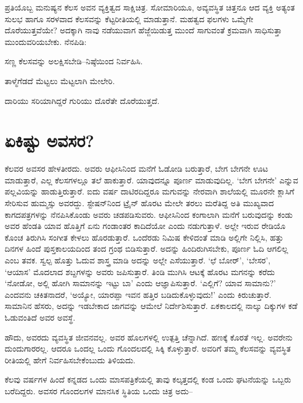 ಪ್ರತಿಯೊಬ್ಬ ಮನುಷ್ಯನ ಕೆಲಸ ಅವನ ವ್ಯಕ್ತಿತ್ವದ ಸಾಕ್ಷಿಚಿತ್ರ. ಸೋಮಾರಿಯೂ, ಅವ್ಯವಸ್ಥಿತ ಚಿತ್ತನೂ ಆದ ವ್ಯಕ್ತಿ ಅತ್ಯಂತ ಸುಲಭ ಹಾಗೂ ಸರಳವಾದ ಕೆಲಸವನ್ನು ಕೆಟ್ಟರೀತಿಯಲ್ಲಿ ಮಾಡುತ್ತಾನೆ. ಮಹತ್ವದ ಫಲಗಳು ಒಮ್ಮೆಗೇ ದೊರೆಯುತ್ತವೆಯೇ? ಅದಕ್ಕಾಗಿ ನಾವು ನಡೆಯುವಾಗ ಹೆಜ್ಜೆಯಿಡುತ್ತ ಮುಂದೆ ಸಾಗುವಂತೆ ಕ್ರಮವಾಗಿ ಸಾಧಿಸುತ್ತಾ ಮುಂದುವರಿಯಬೇಕು. ನೆನಪಿಡಿ:

ಸಣ್ಣ ಕೆಲಸವನ್ನು ಅಲಕ್ಷಿಸಬೇಡಿ–ನಿಷ್ಠೆಯಿಂದ ನಿರ್ವಹಿಸಿ.

ತಾಳ್ಮೆಗೆಡದೆ ಮೆಟ್ಟಲು ಮೆಟ್ಟಲಾಗಿ ಮೇಲೇರಿ.

ದಾರಿಯು ಸರಿಯಾಗಿದ್ದರೆ ಗುರಿಯು ದೊರೆತೇ ದೊರೆಯುತ್ತದೆ.


\section*{ಏಕಿಷ್ಟು ಅವಸರ?}


ಕೆಲವರ ಅವಸರ ಹೇಳತೀರದು. ಅವರು ಆಫೀಸಿನಿಂದ ಮನೆಗೆ ಓಡೋಡಿ ಬರುತ್ತಾರೆ, ಬೇಗ ಬೇಗನೇ ಊಟ ಮಾಡುತ್ತಾರೆ, ಎಲ್ಲ ಕೆಲಸಗಳಲ್ಲೂ ತಲೆ ಹಾಕುತ್ತಾರೆ. ಯಾವುದನ್ನೂ ಪೂರ್ಣ ಮಾಡುವುದಿಲ್ಲ. ‘ಬೇಗ ಬೇಗನೇ’ ಎನ್ನುವ ಪಲ್ಲವಿಯನ್ನು ಹಾಡುತ್ತಿರುತ್ತಾರೆ. ಐದು ವರ್ಷ ದಾಟಿರದಿದ್ದರೂ ಮಗುವನ್ನು ನೇರವಾಗಿ ಶಾಲೆಯಲ್ಲಿ ಮೂರನೇ ಕ್ಲಾಸಿಗೆ ಸೇರಿಸುವ ಹುಮ್ಮಸ್ಸು ಅವರದ್ದು. ಸ್ಟೇಷನ್​ನಿಂದ ಟ್ರೈನ್ ಹೊರಟ ಮೇಲೇ ತರಲು ಮರೆತಿದ್ದ ಅತಿ ಮುಖ್ಯವಾದ ಕಾಗದಪತ್ರಗಳನ್ನು ನೆನಪಿಸಿಕೊಂಡು ಅವರು ಚಡಪಡಿಸುವರು. ಆಫೀಸಿನಿಂದ ಕಂಗಾಲಾಗಿ ಮನೆಗೆ ಬರುವುದನ್ನು ಕಂಡು ಅವರ ಹೆಂಡತಿ ಯಾವ ಹೊತ್ತಿಗೆ ಏನು ಗಂಡಾಂತರ ಕಾದಿದೆಯೋ ಎಂದು ನಡುಗುತ್ತಾಳೆ. ಅಲ್ಲೇ ಇರುವ ರೇಡಿಯೊ ಕೊಂಚ ತಿರುಗಿಸಿ ಸಂಗೀತ ಕೇಳಲು ಹೊರಡುತ್ತಾರೆ. ಒಂದೆರಡು ನಿಮಿಷ ಕೇಳಿದಂತೆ ಮಾಡಿ ಅಲ್ಲಿಗೇ ನಿಲ್ಲಿಸಿ, ಹತ್ತು ದಿನಗಳ ಹಿಂದೆ ಪುಸ್ತಕಾಲಯದಿಂದ ತಂದ ಗ್ರಂಥ ಬಿಡಿಸುತ್ತಾರೆ. ಅದನ್ನು ಹಿಂದಿರುಗಿಸಬೇಕು, ಪೂರ್ಣ ಓದಿ ಆಗಲಿಲ್ಲ ಎಂಬ ತವಕ. ಸ್ವಲ್ಪ ಹೊತ್ತು ಓದುವ ಶಾಸ್ತ್ರ ಮಾಡಿ ಅದನ್ನು ಅಲ್ಲೇ ಎಸೆಯುತ್ತಾರೆ. ‘ಛೆ ಬೋರ್​’, ‘ಬೇಸರ’, ‘ಆಯಾಸ’ ಮೊದಲಾದ ಶಬ್ದಗಳನ್ನು ಅವರು ಜಪಿಸುತ್ತಾರೆ. ತಿಂಡಿ ಮುಗಿಸಿ ಆಟಕ್ಕೆ ಹೊರಟ ಮಗನನ್ನು ಕರೆದು ‘ನೋಡೋ, ಅಲ್ಲಿ ಹೋಗಿ ಸಾಮಾನನ್ನು ಇಟ್ಟು ಬಾ’ ಎಂದು ಆಜ್ಞಾಪಿಸುತ್ತಾರೆ. ‘ಎಲ್ಲಿಗೆ? ಯಾವ ಸಾಮಾನು?’ ಎಂದವನು ಚಕಿತನಾದರೆ, ‘ಅಯ್ಯೋ, ಯಾರಪ್ಪಾ ಇವನ ಹತ್ತಿರ ಬಡಿದುಕೊಳ್ಳುವುದು!’ ಎಂದು ಕಿರುಚುತ್ತಾರೆ. ಸಾಮಾನಿನ ಹೆಸರು, ಅದನ್ನು ಇಡಬೇಕಾದ ಜಾಗವನ್ನು ಆಮೇಲೆ ನಿರ್ದೇಶಿಸುತ್ತಾರೆ. ಏಕಕಾಲದಲ್ಲಿ ನಾಲ್ಕು ದಿಕ್ಕುಗಳ ಕಡೆ ಓಡುವಂತಿದೆ ಅವರ ಅವಸ್ಥೆ.

ಹೌದು, ಅವರದು ವ್ಯವಸ್ಥಿತ ಜೀವನವಲ್ಲ. ಅವರ ಹೊಲಗಳಲ್ಲಿ ಉತ್ಪತ್ತಿ ಚೆನ್ನಾಗಿದೆ. ಹಣಕ್ಕೆ ಕೊರತೆ ಇಲ್ಲ. ಅವರೇನು ದುಂದುಗಾರರಲ್ಲ. ಆದರೂ ಒಂದಲ್ಲ ಒಂದು ಗೊಂದಲದಲ್ಲಿ ಸಿಕ್ಕಿ ಕೊಳ್ಳುತ್ತಾರೆ. ಅವರಿಗೆ ತಮ್ಮ ಕೆಲಸವನ್ನು ವ್ಯವಸ್ಥಿತ ರೀತಿಯಲ್ಲಿ ಹೇಗೆ ನಿರ್ವಹಿಸಬೇಕೆಂಬುದು ತಿಳಿಯದು.

ಕೆಲವು ವರ್ಷಗಳ ಹಿಂದೆ ಕನ್ನಡದ ಒಂದು ಮಾಸಪತ್ರಿಕೆಯಲ್ಲಿ ತಾವು ಕಲ್ಕತ್ತದಲ್ಲಿ ಕಂಡ ಒಂದು ಘಟನೆಯನ್ನು ಒಬ್ಬರು ಬರೆದಿದ್ದರು. ಅವಸರ ಗೊಂದಲಗಳ ಮಾನಸಿಕ ಸ್ಥಿತಿಯ ಒಂದು ಚಿತ್ರ ಅದು–

\newpage

